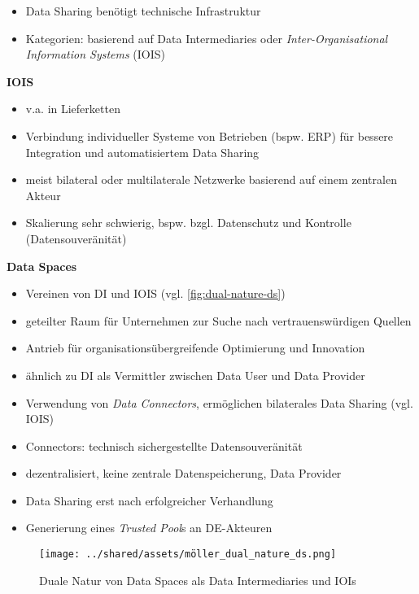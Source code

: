 \begin{itemize}
    \item Data Sharing benötigt technische Infrastruktur
    \item Kategorien: basierend auf Data Intermediaries oder \emph{Inter-Organisational Information Systems} (IOIS)
\end{itemize}

\vspace{1cm}

\textbf{IOIS}
\begin{itemize}
    \item v.a. in Lieferketten
    \item Verbindung individueller Systeme von Betrieben (bspw. ERP) für bessere Integration und automatisiertem Data Sharing
    \item meist bilateral oder multilaterale Netzwerke basierend auf einem zentralen Akteur
    \item Skalierung sehr schwierig, bspw. bzgl. Datenschutz und Kontrolle (Datensouveränität)
\end{itemize}

\vspace{1cm}

\textbf{Data Spaces}
\begin{itemize}
    \item Vereinen von DI und IOIS (vgl. \autoref{fig:dual-nature-ds})
    \item geteilter Raum für Unternehmen zur Suche nach vertrauenswürdigen Quellen
    \item Antrieb für organisationsübergreifende Optimierung und Innovation
    \item ähnlich zu DI als Vermittler zwischen Data User und Data Provider
    \item Verwendung von \emph{Data Connectors}, ermöglichen bilaterales Data Sharing (vgl. IOIS)
    \item Connectors: technisch sichergestellte Datensouveränität
    \item dezentralisiert, keine zentrale Datenspeicherung, Data Provider
    \item Data Sharing erst nach erfolgreicher Verhandlung
    \item Generierung eines \emph{Trusted Pool}s an DE-Akteuren~\cite{mollerIndustrialDataEcosystems2024}
\end{itemize}

\begin{figure}
    \texttt{[image: ../shared/assets/möller\_dual\_nature\_ds.png]}
    \caption{Duale Natur von Data Spaces als Data Intermediaries und IOIs~\cite{mollerIndustrialDataEcosystems2024}}
    \label{fig:dual-nature-ds}
\end{figure}

